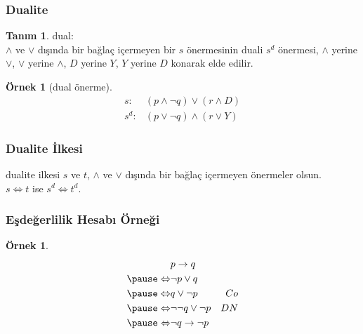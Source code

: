 \documentclass[dvipsnames]{beamer}
\theoremstyle{definition}
\newtheorem{tanim}[theorem]{Tanım}
\theoremstyle{example}
\newtheorem{ornek}[theorem]{Örnek}
\theoremstyle{plain}
\begin{document}
\begin{frame}
  \frametitle{Dualite}

  \begin{tanim}
    \alert{dual}:\\
      $\wedge$ ve $\vee$ dışında bir bağlaç içermeyen bir $s$
      önermesinin duali $s^d$ önermesi, $\wedge$ yerine $\vee$, $\vee$
      yerine $\wedge$, $D$ yerine $Y$, $Y$ yerine $D$ konarak elde edilir.
  \end{tanim}

  \pause
  \begin{ornek}[dual önerme]
    \begin{eqnarray*}
      s:   & (p \wedge \neg q) \vee (r \wedge D)\\
      s^d: & (p \vee \neg q) \wedge (r \vee Y)
    \end{eqnarray*}
  \end{ornek}
\end{frame}

\begin{frame}
  \frametitle{Dualite İlkesi}

  \begin{block}{dualite ilkesi}
      $s$ ve $t$, $\wedge$ ve $\vee$ dışında bir bağlaç içermeyen önermeler
      olsun.\\
      $s \Leftrightarrow t$ ise $s^d \Leftrightarrow t^d$.
  \end{block}
\end{frame}

\begin{frame}
  \frametitle{Eşdeğerlilik Hesabı Örneği}

  \begin{ornek}
    \begin{eqnarray*}
                      & p \rightarrow q           &\\
      \pause
      \Leftrightarrow & \neg p \vee q             &\\
      \pause
      \Leftrightarrow & q \vee \neg p             & Co\\
      \pause
      \Leftrightarrow & \neg \neg q \vee \neg p   & DN\\
      \pause
      \Leftrightarrow & \neg q \rightarrow \neg p &
    \end{eqnarray*}
  \end{ornek}
\end{frame}
\end{document}
